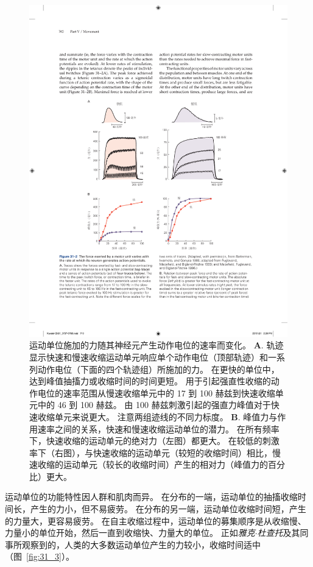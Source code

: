 \begin{figure}[htbp]
	\centering
	\includegraphics[width=0.87\linewidth]{chap31/fig_31_2}
	\caption{运动单位施加的力随其神经元产生动作电位的速率而变化。
		\textbf{A}. 轨迹显示快速和慢速收缩运动单元响应单个动作电位（顶部轨迹）和一系列动作电位（下面的四个轨迹组）所施加的力。
	在更快的单位中，达到峰值抽搐力或收缩时间的时间更短。
	用于引起强直性收缩的动作电位的速率范围从慢速收缩单元中的 17 到 100 赫兹到快速收缩单元中的 46 到 100 赫兹。
	由 100 赫兹刺激引起的强直力峰值对于快速收缩单元来说更大。
	注意两组迹线的不同力标度\cite{botterman1986gradation,fuglevand1999force,macefield1996contractile}。
	\textbf{B}. 峰值力与作用速率之间的关系，快速和慢速收缩运动单位的潜力。
	在所有频率下，快速收缩的运动单元的绝对力（左图）都更大。
	在较低的刺激率下（右图），与快速收缩的运动单元（较短的收缩时间）相比，慢速收缩的运动单元（较长的收缩时间）产生的相对力（峰值力的百分比）更大。}
	\label{fig:31_2}
\end{figure}


运动单位的功能特性因人群和肌肉而异。
在分布的一端，运动单位的抽搐收缩时间长，产生的力小，但不易疲劳。
在分布的另一端，运动单位收缩时间短，产生的力量大，更容易疲劳。
在自主收缩过程中，运动单位的募集顺序是从收缩慢、力量小的单位开始，然后一直到收缩快、力量大的单位。 
正如\textit{雅克$\cdot$杜查托}及其同事所观察到的，人类的大多数运动单位产生的力较小，收缩时间适中（图~\ref{fig:31_3}）。


